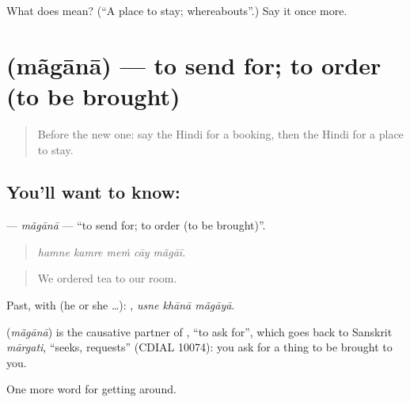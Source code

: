 \begin{tcolorbox}[breakable,colback=teal!4,colframe=teal!35!black,title={Before you move on}]
What does  mean? (\textquotedblleft{}A place to stay; whereabouts\textquotedblright{}.) Say it once more.
\end{tcolorbox}
\section[\texorpdfstring{\hi{मँगाना} (mãgānā)}{मँगाना (mãgānā)}]{ (mãgānā) — to send for; to order (to be brought)}

\label{lesson:HI-C415-magana}



\begin{quote}
Before the new one: say the Hindi for a booking, then the Hindi for a place to stay.
\end{quote}

\subsection*{You'll want to know: }
\textbf{} — \emph{mãgānā} — \textquotedblleft{}to send for; to order (to be brought)\textquotedblright{}.

\begin{quote}
    
\end{quote}

\begin{quote}
\emph{hamne kamre meṁ cāy mãgāī.}
\end{quote}

\begin{quote}
We ordered tea to our room.
\end{quote}

Past, with  (he or she …):   , \emph{usne khānā mãgāyā}.

\begin{cousinweb}
\textbf{} (\emph{mãgānā}) is the causative partner of , \textquotedblleft{}to ask for\textquotedblright{}, which goes back to Sanskrit \emph{mārgati}, \textquotedblleft{}seeks, requests\textquotedblright{} (CDIAL 10074): you ask for a thing to be brought to you.
\end{cousinweb}

\begin{grammarlens}[title={What you've built}]
One more word for getting around.
\end{grammarlens}

